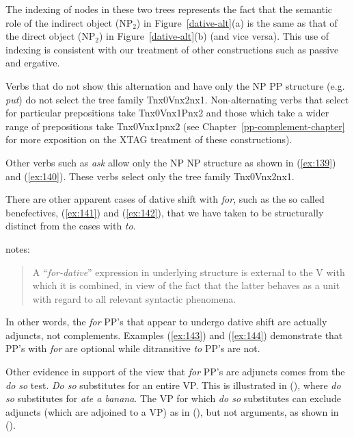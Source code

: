 The indexing of nodes in these two trees represents the fact that the semantic 
role of the indirect object (NP$_2$) in Figure~\ref{dative-alt}(a) is the same 
as that of the direct object (NP$_2$) in Figure~\ref{dative-alt}(b) (and vice 
versa).  This use of indexing is consistent with our treatment of other 
constructions such as passive and ergative. 
 
Verbs that do not show this alternation and have only the NP PP 
structure (e.g. {\it put\/}) do not select the tree family 
Tnx0Vnx2nx1.  Non-alternating verbs that select for particular prepositions 
take 
Tnx0Vnx1Pnx2 and those which take a wider range of prepositions take 
Tnx0Vnx1pnx2 (see Chapter~\ref{pp-complement-chapter} for more 
exposition on the XTAG treatment of these constructions).  
 
Other verbs such as {\it ask} allow only the NP NP structure as shown 
in (\ref{ex:139}) and (\ref{ex:140}).  These verbs select only the tree family 
Tnx0Vnx2nx1. 
 
\beginsentences
{}\label{ex:139} 
\label{ex:140} 
\endsentences

 
There are other apparent cases of dative shift with {\it for}, such as 
the so called benefectives, 
(\ref{ex:141}) and (\ref{ex:142}), that we have taken to be structurally distinct from the 
cases with {\it to}. 
 
\beginsentences
{}\label{ex:141} 
\label{ex:142} 
\endsentences

 
\cite{mccawley88} notes: 
 
\begin{quote} 
A ``{\it for-dative}'' expression in underlying structure is external 
to the V with which it is combined, in view of the fact that the 
latter behaves as a unit with regard to all relevant syntactic 
phenomena. 
\end{quote} 
 
 
In other words, the {\it for} PP's that appear to undergo dative shift are 
actually adjuncts, not complements. Examples (\ref{ex:143}) and (\ref{ex:144}) demonstrate 
that PP's with {\it for} are optional while ditransitive {\it to} PP's are not. 
 
\beginsentences
{}\label{ex:143} 
\label{ex:144} 
\endsentences

 
Other evidence in support of the view that {\it for} PP's are adjuncts 
comes from the {\it do so} test.  {\it Do so} substitutes for an entire VP. This 
is illustrated in (), where {\it do so} substitutes for {\it ate a banana}. The VP for which {\it do so} substitutes can exclude adjuncts (which 
are adjoined to a VP) as in (), but not arguments, as shown in (). 
 
